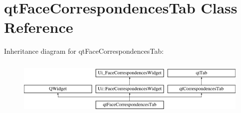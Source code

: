 \hypertarget{classqt_face_correspondences_tab}{}\section{qt\+Face\+Correspondences\+Tab Class Reference}
\label{classqt_face_correspondences_tab}
Inheritance diagram for qt\+Face\+Correspondences\+Tab\+:\begin{figure}[H]
\begin{center}
\leavevmode
\includegraphics[height=2.718446cm]{classqt_face_correspondences_tab}
\end{center}
\end{figure}

